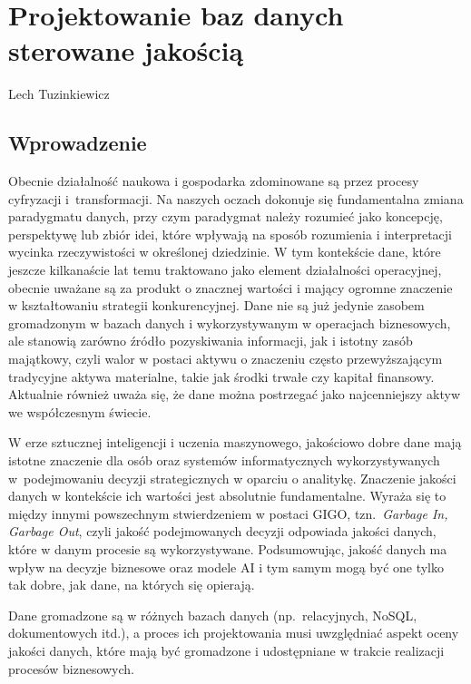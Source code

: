 \chapter[Projektowanie baz \ldots]{Projektowanie baz danych sterowane jakością}
\thispagestyle{empty}
\vspace{-8mm} {\large Lech Tuzinkiewicz} \vspace{8mm}



\section{Wprowadzenie}

Obecnie działalność naukowa i gospodarka zdominowane są przez procesy cyfryzacji i~transformacji. Na naszych oczach dokonuje się fundamentalna zmiana paradygmatu danych, przy czym paradygmat należy rozumieć jako koncepcję, perspektywę lub zbiór idei, które wpływają na sposób rozumienia i interpretacji wycinka rzeczywistości w określonej dziedzinie. W tym kontekście dane, które jeszcze kilkanaście lat temu traktowano jako element działalności operacyjnej, obecnie uważane są za produkt o znacznej wartości i mający ogromne znaczenie w kształtowaniu strategii konkurencyjnej. Dane nie są już jedynie zasobem gromadzonym w bazach danych i wykorzystywanym w operacjach biznesowych, ale stanowią zarówno źródło pozyskiwania informacji, jak i istotny zasób majątkowy, czyli walor w postaci aktywu o znaczeniu często przewyższającym tradycyjne aktywa materialne, takie jak środki trwałe czy kapitał finansowy. Aktualnie również uważa się, że dane można postrzegać jako najcenniejszy aktyw we współczesnym świecie.

W erze sztucznej inteligencji i uczenia maszynowego, jakościowo dobre dane mają istotne znaczenie dla osób oraz systemów informatycznych wykorzystywanych w~podejmowaniu decyzji strategicznych w oparciu o analitykę. Znaczenie jakości danych w kontekście ich wartości jest absolutnie fundamentalne. Wyraża się to między innymi powszechnym stwierdzeniem w postaci GIGO, tzn.\ \emph{Garbage In, Garbage Out}, czyli jakość podejmowanych decyzji odpowiada jakości danych, które w danym procesie są wykorzystywane. Podsumowując, jakość danych ma wpływ na decyzje biznesowe oraz modele AI i tym samym mogą być one tylko tak dobre, jak dane, na których się opierają.

Dane gromadzone są w różnych bazach danych (np.\ relacyjnych, NoSQL, dokumentowych itd.), a proces ich projektowania musi uwzględniać aspekt oceny jakości danych, które mają być gromadzone i udostępniane w trakcie realizacji procesów biznesowych.

